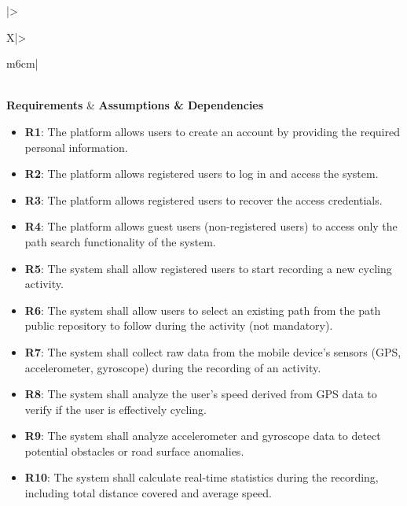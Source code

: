 \begin{table}[H]
    \centering
    \renewcommand{\arraystretch}{1.3}
    \begin{tabularx}{\textwidth}{|>{\raggedright\arraybackslash}X|>{\raggedright\arraybackslash}m{6cm}|}
        \hline
         \\ \hline
        \centering\textbf{Requirements} & \centering\textbf{Assumptions \& Dependencies} \tabularnewline \hline
        
        \begin{minipage}[t]{\linewidth}
        \begin{itemize}[leftmargin=*, nosep, label={}]
            \item \textbf{R1}: The platform allows users to create an account by providing the required personal information.
            \item \textbf{R2}: The platform allows registered users to log in and access the system.
            \item \textbf{R3}: The platform allows registered users to recover the access credentials.
            \item \textbf{R4}: The platform allows guest users (non-registered users) to access only the path search functionality of the system.
            \item \textbf{R5}: The system shall allow registered users to start recording a new cycling activity.
            \item \textbf{R6}: The system shall allow users to select an existing path from the path public repository to follow during the activity (not mandatory).
            \item \textbf{R7}: The system shall collect raw data from the mobile device’s sensors (GPS, accelerometer, gyroscope) during the recording of an activity.
            \item \textbf{R8}: The system shall analyze the user’s speed derived from GPS data to verify if the user is effectively cycling.
            \item \textbf{R9}: The system shall analyze accelerometer and gyroscope data to detect potential obstacles or road surface anomalies.
            \item \textbf{R10}: The system shall calculate real-time statistics during the recording, including total distance covered and average speed.

\end{itemize}
\end{minipage}
\end{tabularx}
\end{table}
